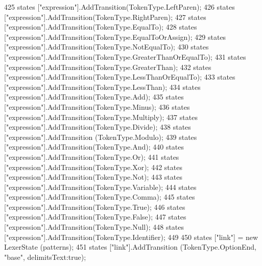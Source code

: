 \begin{DoxyCode}
{425             states [\textcolor{stringliteral}{"expression"}].AddTransition(TokenType.LeftParen);
426             states [\textcolor{stringliteral}{"expression"}].AddTransition(TokenType.RightParen);
427             states [\textcolor{stringliteral}{"expression"}].AddTransition(TokenType.EqualTo);
428             states [\textcolor{stringliteral}{"expression"}].AddTransition(TokenType.EqualToOrAssign);
429             states [\textcolor{stringliteral}{"expression"}].AddTransition(TokenType.NotEqualTo);
430             states [\textcolor{stringliteral}{"expression"}].AddTransition(TokenType.GreaterThanOrEqualTo);
431             states [\textcolor{stringliteral}{"expression"}].AddTransition(TokenType.GreaterThan);
432             states [\textcolor{stringliteral}{"expression"}].AddTransition(TokenType.LessThanOrEqualTo);
433             states [\textcolor{stringliteral}{"expression"}].AddTransition(TokenType.LessThan);
434             states [\textcolor{stringliteral}{"expression"}].AddTransition(TokenType.Add);
435             states [\textcolor{stringliteral}{"expression"}].AddTransition(TokenType.Minus);
436             states [\textcolor{stringliteral}{"expression"}].AddTransition(TokenType.Multiply);
437             states [\textcolor{stringliteral}{"expression"}].AddTransition(TokenType.Divide);
438             states [\textcolor{stringliteral}{"expression"}].AddTransition (TokenType.Modulo);
439             states [\textcolor{stringliteral}{"expression"}].AddTransition(TokenType.And);
440             states [\textcolor{stringliteral}{"expression"}].AddTransition(TokenType.Or);
441             states [\textcolor{stringliteral}{"expression"}].AddTransition(TokenType.Xor);
442             states [\textcolor{stringliteral}{"expression"}].AddTransition(TokenType.Not);
443             states [\textcolor{stringliteral}{"expression"}].AddTransition(TokenType.Variable);
444             states [\textcolor{stringliteral}{"expression"}].AddTransition(TokenType.Comma);
445             states [\textcolor{stringliteral}{"expression"}].AddTransition(TokenType.True);
446             states [\textcolor{stringliteral}{"expression"}].AddTransition(TokenType.False);
447             states [\textcolor{stringliteral}{"expression"}].AddTransition(TokenType.Null);
448             states [\textcolor{stringliteral}{"expression"}].AddTransition(TokenType.Identifier);
449 
450             states [\textcolor{stringliteral}{"link"}] = \textcolor{keyword}{new} LexerState (patterns);
451             states [\textcolor{stringliteral}{"link"}].AddTransition (TokenType.OptionEnd, \textcolor{stringliteral}{"base"}, delimitsText:\textcolor{keyword}{true});
}
\end{DoxyCode}
